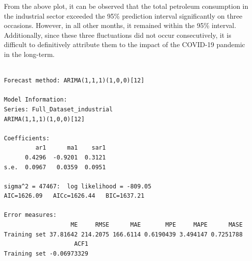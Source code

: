 \documentclass[
  letterpaper,
  DIV=11,
  numbers=noendperiod]{scrartcl}
\begin{document}
From the above plot, it can be observed that the total petroleum
consumption in the industrial sector exceeded the 95\% prediction
interval significantly on three occasions. However, in all other months,
it remained within the 95\% interval. Additionally, since these three
fluctuations did not occur consecutively, it is difficult to
definitively attribute them to the impact of the COVID-19 pandemic in
the long-term.

\begin{verbatim}

Forecast method: ARIMA(1,1,1)(1,0,0)[12]

Model Information:
Series: Full_Dataset_industrial 
ARIMA(1,1,1)(1,0,0)[12] 

Coefficients:
         ar1      ma1    sar1
      0.4296  -0.9201  0.3121
s.e.  0.0967   0.0359  0.0951

sigma^2 = 47467:  log likelihood = -809.05
AIC=1626.09   AICc=1626.44   BIC=1637.21

Error measures:
                   ME     RMSE      MAE       MPE     MAPE      MASE
Training set 37.81642 214.2075 166.6114 0.6190439 3.494147 0.7251788
                    ACF1
Training set -0.06973329


\end{verbatim}
\end{document}
